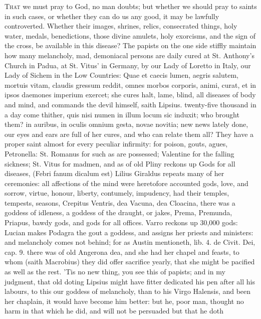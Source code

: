 {\lettrine{T}{hat} we must pray to God, no man doubts; but whether we should pray to
saints in such cases, or whether they can do us any good, it may be
lawfully controverted. Whether their images, shrines, relics,
consecrated things, holy water, medals, benedictions, those divine
amulets, holy exorcisms, and the sign of the cross, be available in
this disease? The papists on the one side stiffly maintain how many
melancholy, mad, demoniacal persons are daily cured at St. Anthony's
Church in Padua, at St. Vitus' in Germany, by our Lady of Loretto in
Italy, our Lady of Sichem in the Low Countries: Quae et caecis
lumen, aegris salutem, mortuis vitam, claudis gressum reddit, omnes
morbos corporis, animi, curat, et in ipsos daemones imperium exercet;
she cures halt, lame, blind, all diseases of body and mind, and
commands the devil himself, saith Lipsius. twenty-five thousand in a
day come thither, quis nisi numen in illum locum sic induxit; who
brought them? in auribus, in oculis omnium gesta, novae novitia; new
news lately done, our eyes and ears are full of her cures, and who can
relate them all? They have a proper saint almost for every peculiar
infirmity: for poison, gouts, agues, Petronella: St. Romanus for such
as are possessed; Valentine for the falling sickness; St. Vitus for
madmen, \etc{} and as of old Pliny reckons up Gods for all diseases,
(Febri fanum dicalum est) Lilius Giraldus repeats many of her
ceremonies: all affections of the mind were heretofore accounted gods,
love, and sorrow, virtue, honour, liberty, contumely, impudency,
had their temples, tempests, seasons, Crepitus Ventris, dea Vacuna, dea
Cloacina, there was a goddess of idleness, a goddess of the draught, or
jakes, Prema, Premunda, Priapus, bawdy gods, and gods for all 
offices. Varro reckons up 30,000 gods: Lucian makes Podagra the gout a
goddess, and assigns her priests and ministers: and melancholy comes
not behind; for as Austin mentioneth, lib. 4. de Civit. Dei, cap. 9.
there was of old Angerona dea, and she had her chapel and feasts, to
whom (saith Macrobius) they did offer sacrifice yearly, that she
might be pacified as well as the rest. 'Tis no new thing, you see this
of papists; and in my judgment, that old doting Lipsius might have
fitter dedicated his pen after all his labours, to this our
goddess of melancholy, than to his Virgo Halensis, and been her
chaplain, it would have become him better: but he, poor man, thought no
harm in that which he did, and will not be persuaded but that he doth
}
